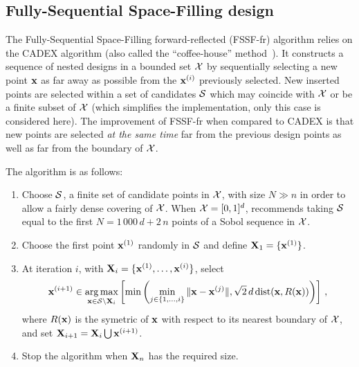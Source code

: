  

\subsection{Fully-Sequential Space-Filling design}\label{sec:FSSF}

The Fully-Sequential Space-Filling forward-reflected (FSSF-fr) algorithm \cite{shang_apley_2020} relies on the CADEX algorithm \cite{kensto69} (also called the ``coffee-house'' method~\cite{mul07}). 
It constructs a sequence of nested designs in a bounded set $\mathcal{X}$ by sequentially selecting a new point ${\bf x}$ as far away as possible from the ${\bf x}^{(i)}$ previously selected. 
New inserted points are selected within a set of candidates $\mathcal{S}$ which may coincide with $\mathcal{X}$ or be a finite subset of $\mathcal{X}$ (which simplifies the implementation, only this case is considered here). 
The improvement of FSSF-fr when compared to CADEX is that new points are selected {\em at the same time} far from the previous design points as well as far from the boundary of $\mathcal{X}$. 

The algorithm is as follows:
\begin{enumerate}
  \item Choose $\mathcal{S}$, a finite set of candidate points in $\mathcal{X}$, with size $N \gg n$ in order to allow a fairly dense covering of $\mathcal{X}$. 
  When $\mathcal{X}=[0,1]^d$, \cite{shang_apley_2020} recommends taking $\mathcal{S}$ equal to the first $N=1\,000\,d+2\,n$ points of a Sobol sequence in $\mathcal{X}$. 
  
  \item Choose the first point ${\bf x}^{(1)}$ randomly in $\mathcal{S}$ and define ${\bf X}_1 = \{{\bf x}^{(1)}\}$. 
  
  \item At iteration $i$, with ${\bf X}_i = \{{\bf x}^{(1)},\ldots, {\bf x}^{(i)}\}$, select
  \begin{equation}\label{eq:FSSF-fr}
    {\bf x}^{(i+1)} \in \operatorname*{arg\,max}_{{\bf x} \in \mathcal{S} \setminus {\bf X}_i} \left[ \min\left( \min_{j \in \{1,\ldots,i\}} \|{\bf x}-{\bf x}^{(j)}\|, \sqrt{2}\,d \,\mbox{dist}({\bf x},R({\bf x})) \right) \right]\,, 
  \end{equation}
  where $R({\bf x})$ is the symetric of ${\bf x}$ with respect to its nearest boundary of $\mathcal{X}$,
  and set ${\bf X}_{i+1} = {\bf X}_i \bigcup {\bf x}^{(i+1)}$.
  
  \item Stop the algorithm when ${\bf X}_n$ has the required size.
\end{enumerate}

